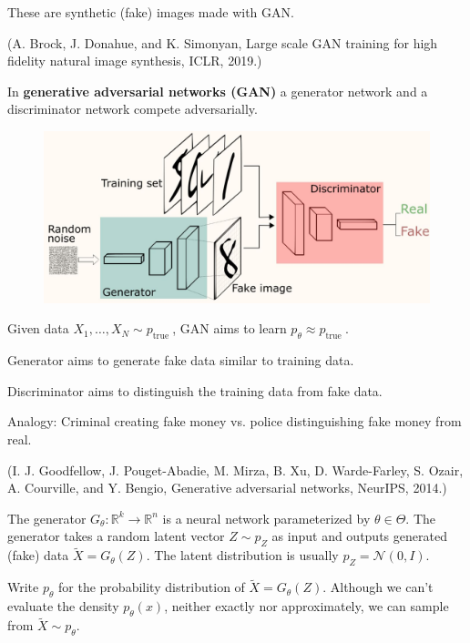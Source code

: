 These are synthetic (fake) images made with GAN.

(A. Brock, J. Donahue, and K. Simonyan, Large scale GAN training for high fidelity natural image synthesis, ICLR, 2019.)

\begin{definition}
    In \textbf{generative adversarial networks (GAN)} a generator network and a discriminator network compete adversarially.

    \begin{figure}[H]
        \centering
        \includegraphics[width=1.0\textwidth]{.././assets/12.2.jpg}
    \end{figure}

    Given data $X_{1}, \ldots, X_{N} \sim p_{\text {true }}$, GAN aims to learn $p_{\theta} \approx p_{\text {true }}$.

    Generator aims to generate fake data similar to training data.

    Discriminator aims to distinguish the training data from fake data.

    Analogy: Criminal creating fake money vs. police distinguishing fake money from real.

    (I. J. Goodfellow, J. Pouget-Abadie, M. Mirza, B. Xu, D. Warde-Farley, S. Ozair, A. Courville, and Y. Bengio, Generative adversarial networks, NeurIPS, 2014.)
\end{definition}

\begin{definition}
    The generator $G_{\theta}: \mathbb{R}^{k} \rightarrow \mathbb{R}^{n}$ is a neural network parameterized by $\theta \in \Theta$. The generator takes a random latent vector $Z \sim p_{Z}$ as input and outputs generated (fake) data $\tilde{X}=G_{\theta}(Z)$. The latent distribution is usually $p_{Z}=\mathcal{N}(0, I)$.

    Write $p_{\theta}$ for the probability distribution of $\tilde{X}=G_{\theta}(Z)$. Although we can't evaluate the density $p_{\theta}(x)$, neither exactly nor approximately, we can sample from $\tilde{X} \sim p_{\theta}$.
\end{definition}

